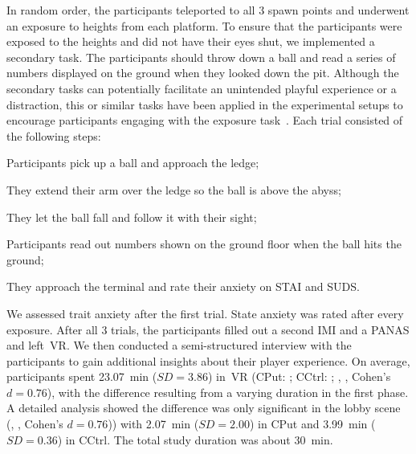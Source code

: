 In random order, the participants teleported to all $3$ spawn points and underwent an exposure to heights from each platform. To ensure that the participants were exposed to the heights and did not have their eyes shut, we implemented a secondary task. The participants should throw down a ball and read a series of numbers displayed on the ground when they looked down the pit.
Although the secondary tasks can potentially facilitate an unintended playful experience or a distraction, this or similar tasks have been applied in the experimental setups to encourage participants engaging with the exposure task~\cite{diemer2016, meehan2002, schulz2019}.
Each trial consisted of the following steps:
\begin{enumerate*}
    \item Participants pick up a ball and approach the ledge;
    \item They extend their arm over the ledge so the ball is above the abyss;
    \item They let the ball fall and follow it with their sight;
    \item Participants read out numbers shown on the ground floor when the ball hits the ground;
    \item They approach the terminal and rate their anxiety on STAI and SUDS.
\end{enumerate*} We assessed trait anxiety after the first trial. State anxiety was rated after every exposure.
After all $3$ trials, the participants filled out a second IMI and a PANAS and left~\ac{VR}.
We then conducted a semi-structured interview with the participants to gain additional insights about their player experience. On average, participants spent \SI{23.07}{\minute} ($SD{=}3.86$) in~\ac{VR} (\acl{CPut}: ; \acl{CCtrl}: ; , , Cohen's $d{=}0.76$), with the difference resulting from a varying duration in the first phase. A detailed analysis showed the difference was only significant in the lobby scene (, , Cohen's $d{=}0.76$)) with \SI{2.07}{\minute} ($SD{=}2.00$) in \acl{CPut} and \SI{3.99}{\minute} ($SD{=}0.36$) in \acl{CCtrl}. The total study duration was about \SI{30}{\minute}.
